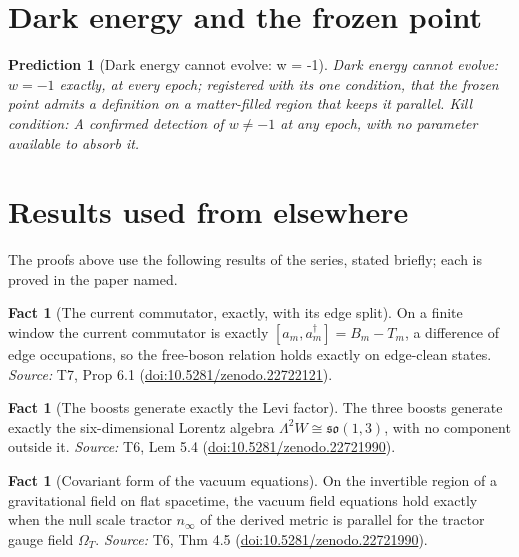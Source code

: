 \documentclass[11pt]{article}
\newtheorem{prediction}[theorem]{Prediction}
\theoremstyle{definition}
\newtheorem{fact}[theorem]{Fact}
\theoremstyle{plain}
\providecommand{\nInf}{}\renewcommand{\nInf}{n_\infty}
\begin{document}
\section{Dark energy and the frozen point}

\begin{prediction}[Dark energy cannot evolve: w = -1]\label{c:pred.dark-energy-w-minus-one}
Dark energy cannot evolve: $w = -1$ exactly, at every epoch; registered with its one condition, that the frozen point admits a definition on a matter-filled region that keeps it parallel.
\emph{Kill condition:} A confirmed detection of $w \neq -1$ at any epoch, with no parameter available to absorb it.
\end{prediction}

\section{Results used from elsewhere}
The proofs above use the following results of the series, stated briefly; each is proved in the paper named.

\begin{fact}[The current commutator, exactly, with its edge split]\label{c:hawking.current-commutator-exactly-edge-split}
On a finite window the current commutator is exactly $[a_{m}, a_{m}^{\dagger}] = B_{m} - T_{m}$, a difference of edge occupations, so the free-boson relation holds exactly on edge-clean states.
\emph{Source:} T7, Prop 6.1 (\href{https://doi.org/10.5281/zenodo.22722121}{doi:10.5281/zenodo.22722121}).
\end{fact}

\begin{fact}[The boosts generate exactly the Levi factor]\label{c:interior.boosts-generate-exactly-levi-factor}
The three boosts generate exactly the six-dimensional Lorentz algebra $\Lambda^2 W \cong \mathfrak{so}(1,3)$, with no component outside it.
\emph{Source:} T6, Lem 5.4 (\href{https://doi.org/10.5281/zenodo.22721990}{doi:10.5281/zenodo.22721990}).
\end{fact}

\begin{fact}[Covariant form of the vacuum equations]\label{c:interior.covariant-form-vacuum-equations}
On the invertible region of a gravitational field on flat spacetime, the vacuum field equations hold exactly when the null scale tractor $\nInf$ of the derived metric is parallel for the tractor gauge field $\Omega_{T}$.
\emph{Source:} T6, Thm 4.5 (\href{https://doi.org/10.5281/zenodo.22721990}{doi:10.5281/zenodo.22721990}).
\end{fact}
\end{document}
